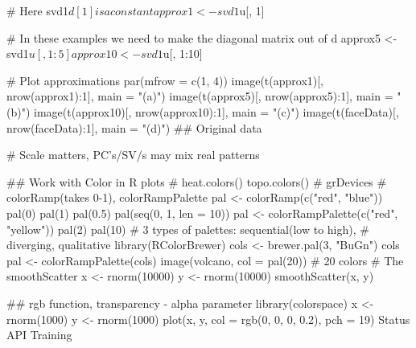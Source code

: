 # Here svd1$d[1] is a constant
approx1 <- svd1$u[, 1] %

# In these examples we need to make the diagonal matrix out of d
approx5 <- svd1$u[, 1:5] %
approx10 <- svd1$u[, 1:10] %

# Plot approximations
par(mfrow = c(1, 4))
image(t(approx1)[, nrow(approx1):1], main = "(a)")
image(t(approx5)[, nrow(approx5):1], main = "(b)")
image(t(approx10)[, nrow(approx10):1], main = "(c)")
image(t(faceData)[, nrow(faceData):1], main = "(d)")  ## Original data

# Scale matters, PC's/SV/s may mix real patterns

## Work with Color in R plots
# 
heat.colors()
topo.colors()
# grDevices
# colorRamp(takes 0-1), colorRampPalette
pal <- colorRamp(c("red", "blue"))
pal(0)
pal(1)
pal(0.5)
pal(seq(0, 1, len = 10))
pal <- colorRampPalette(c("red", "yellow"))
pal(2)
pal(10)
# 3 types of palettes: sequential(low to high), 
#                      diverging, qualitative
library(RColorBrewer)
cols <- brewer.pal(3, "BuGn")
cols
pal <- colorRampPalette(cols)
image(volcano, col = pal(20)) # 20 colors
# The smoothScatter
x <- rnorm(10000)
y <- rnorm(10000)
smoothScatter(x, y)

## rgb function, transparency - alpha parameter
library(colorspace)
x <- rnorm(1000)
y <- rnorm(1000)
plot(x, y, col = rgb(0, 0, 0, 0.2), pch = 19)
Status API Training
